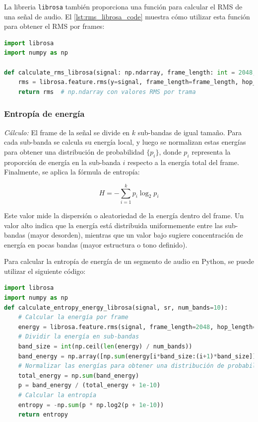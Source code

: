 La libreria \texttt{librosa} \cite{mcfee_librosa_2025} también proporciona una función para calcular el RMS de una señal de audio. El \autoref{lst:rms_librosa_code} muestra cómo utilizar esta función para obtener el RMS por frames:

\begin{lstlisting}[language=Python, label={lst:rms_librosa_code}, caption={Cálculo de RMS utilizando librosa}]
import librosa
import numpy as np

def calculate_rms_librosa(signal: np.ndarray, frame_length: int = 2048, hop_length: int = 512) -> np.ndarray:
    rms = librosa.feature.rms(y=signal, frame_length=frame_length, hop_length=hop_length)[0]
    return rms  # np.ndarray con valores RMS por trama
\end{lstlisting}

\subsubsection{Entropía de energía}

\textit{Cálculo:} El frame de la señal se divide en $k$ sub-bandas de igual tamaño. Para cada sub-banda se calcula su energía local, y luego se normalizan estas energías para obtener una distribución de probabilidad \( \{p_i\} \), donde \( p_i \) representa la proporción de energía en la sub-banda \( i \) respecto a la energía total del frame. Finalmente, se aplica la fórmula de entropía:

\[
    H = -\sum_{i=1}^{k} p_i \log_2 p_i
\]

Este valor mide la dispersión o aleatoriedad de la energía dentro del frame. Un valor alto indica que la energía está distribuida uniformemente entre las sub-bandas (mayor desorden), mientras que un valor bajo sugiere concentración de energía en pocas bandas (mayor estructura o tono definido).

Para calcular la entropía de energía de un segmento de audio en Python, se puede utilizar el siguiente código:

\begin{lstlisting}[language=Python, label={lst:entropy_energy_librosa_code}, caption={Cálculo de entropía de energía utilizando librosa en Python}]
import librosa
import numpy as np
def calculate_entropy_energy_librosa(signal, sr, num_bands=10):
    # Calcular la energía por frame
    energy = librosa.feature.rms(signal, frame_length=2048, hop_length=512)[0]
    # Dividir la energía en sub-bandas
    band_size = int(np.ceil(len(energy) / num_bands))
    band_energy = np.array([np.sum(energy[i*band_size:(i+1)*band_size]) for i in range(num_bands)])
    # Normalizar las energías para obtener una distribución de probabilidad
    total_energy = np.sum(band_energy)
    p = band_energy / (total_energy + 1e-10)
    # Calcular la entropía
    entropy = -np.sum(p * np.log2(p + 1e-10))
    return entropy

\end{lstlisting}

